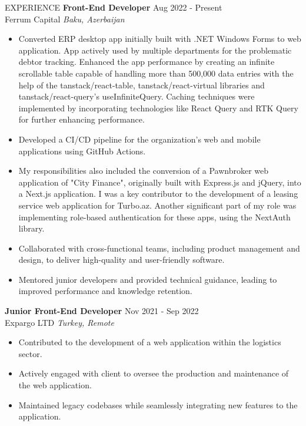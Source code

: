 \documentclass{resume} %
\begin{document}
\begin{rSection}{EXPERIENCE}
\textbf{Front-End Developer} \hfill Aug 2022 - Present\\
Ferrum Capital \hfill \textit{Baku, Azerbaijan}
 \begin{itemize}
    \itemsep -3pt {} 
    \item 
    Converted ERP desktop app initially built with .NET Windows Forms to web application. App actively used by multiple departments for the problematic debtor tracking. Enhanced the app performance by creating an infinite scrollable table capable of handling more than 500,000 data entries with the help of the tanstack/react-table, tanstack/react-virtual libraries and tanstack/react-query's useInfiniteQuery. Caching techniques were implemented by incorporating technologies like React Query and RTK Query for further enhancing performance.
    \item 
    Developed a CI/CD pipeline for the organization's web and mobile applications using GitHub Actions.
    \item 
    My responsibilities also included the conversion of a Pawnbroker web application of "City Finance", originally built with Express.js and jQuery, into a Next.js application. I was a key contributor to the development of a leasing service web application for Turbo.az. Another significant part of my role was implementing role-based authentication for these apps, using the NextAuth library.
     \item Collaborated with cross-functional teams, including product management and design, to deliver high-quality and user-friendly software.
     \item Mentored junior developers and provided technical guidance, leading to improved performance and knowledge retention.
 \end{itemize}
 \vspace{2.5em}
\textbf{Junior Front-End Developer} \hfill Nov 2021 - Sep 2022\\
Expargo LTD \hfill \textit{Turkey, Remote}
 \begin{itemize}
    \itemsep -3pt {} 
     \item Contributed to the development of a web application within the logistics sector. 
     \item Actively engaged with client to oversee the production and maintenance of the web application.
     \item Maintained legacy codebases while seamlessly integrating new features to the application.
 \end{itemize}

\end{rSection} 
\end{document}
